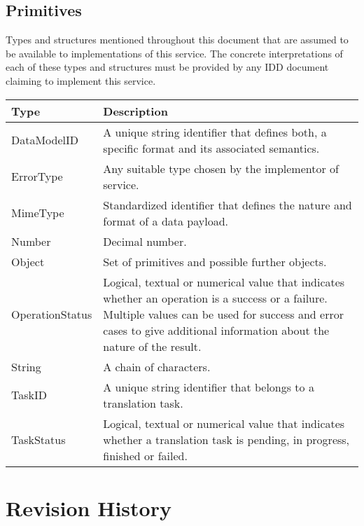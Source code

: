 \documentclass[a4paper]{arrowhead}
\newcommand{\pdef}[1]{{\textcolor{ArrowheadGrey}{#1\label{sec:model:primitives:#1}\label{sec:model:primitives:#1s}\label{sec:model:primitives:#1es}}}}
\begin{document}
\subsection{Primitives}
\label{sec:model:primitives}

Types and structures mentioned throughout this document that are assumed to be available to implementations of this service.
The concrete interpretations of each of these types and structures must be provided by any IDD document claiming to implement this service.


\begin{table}[ht!]
\begin{tabularx}{\textwidth}{| p{3cm} | X |} \hline
\rowcolor{gray!33} Type & Description \\ \hline
\pdef{DataModelID}      & A unique string identifier that defines both, a specific format and its associated semantics. \\ \hline
\pdef{ErrorType}        & Any suitable type chosen by the implementor of service. \\ \hline
\pdef{MimeType}         & Standardized identifier that defines the nature and format of a data payload. \\ \hline
\pdef{Number}           & Decimal number. \\ \hline
\pdef{Object}           & Set of primitives and possible further objects. \\ \hline
\pdef{OperationStatus}  & Logical, textual or numerical value that indicates whether an operation is a success or a failure. Multiple values can be used for success and error cases to give additional information about the nature of the result. \\ \hline
\pdef{String}           & A chain of characters. \\ \hline
\pdef{TaskID}           & A unique string identifier that belongs to a translation task. \\ \hline
\pdef{TaskStatus}       & Logical, textual or numerical value that indicates whether a translation task is pending, in progress, finished or failed. \\ \hline
\end{tabularx}
\end{table}

\newpage




\newpage

\section{Revision History}
\end{document}
